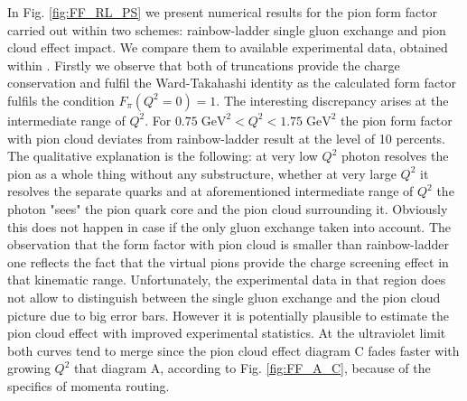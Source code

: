 In Fig. \ref{fig:FF_RL_PS} we present numerical results for the pion form factor carried out within two schemes: rainbow-ladder single gluon exchange and pion cloud effect impact. We compare them to available experimental data, obtained within \cite{Amendolia:1986wj,Volmer:2000ek}. Firstly we observe that both of truncations provide the charge conservation and fulfil the Ward-Takahashi identity as the calculated form factor fulfils the condition $F_\pi(Q^2=0)=1$. The interesting discrepancy arises at the intermediate range of $Q^2$. For $0.75\; \text{GeV}^2 < Q^2 < 1.75\; \text{GeV}^2$ the pion form factor with pion cloud deviates from rainbow-ladder result at the level of 10 percents. The qualitative explanation is the following: at very low $Q^2$ photon resolves the pion as a whole thing without any substructure, whether at very large $Q^2$ it resolves the separate quarks and at aforementioned intermediate range of $Q^2$ the photon "sees" the pion quark core and the pion cloud surrounding it. Obviously this does not happen in case if the only gluon exchange taken into account. The observation that the form factor with pion cloud is smaller than rainbow-ladder one reflects the fact that the virtual pions provide the charge screening effect in that kinematic range. Unfortunately, the experimental data in that region does not allow to distinguish between the single gluon exchange and the pion cloud picture due to big error bars. However it is potentially plausible to estimate the pion cloud effect with improved experimental statistics. At the ultraviolet limit both curves tend to merge since the pion cloud effect diagram C fades faster with growing $Q^2$ that diagram A, according to Fig. \ref{fig:FF_A_C}, because of the specifics of momenta routing.




